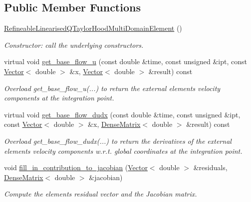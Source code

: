 \subsection*{Public Member Functions}
\begin{DoxyCompactItemize}
\item 
\hyperlink{classRefineableLinearisedQTaylorHoodMultiDomainElement_a7871dc5c779ab057bdcbc22bf541ff3d}{Refineable\+Linearised\+Q\+Taylor\+Hood\+Multi\+Domain\+Element} ()
\begin{DoxyCompactList}\small\item\em Constructor\+: call the underlying constructors. \end{DoxyCompactList}\item 
virtual void \hyperlink{classRefineableLinearisedQTaylorHoodMultiDomainElement_add3d103c76066426856143d9b683053d}{get\+\_\+base\+\_\+flow\+\_\+u} (const double \&time, const unsigned \&ipt, const \hyperlink{classoomph_1_1Vector}{Vector}$<$ double $>$ \&x, \hyperlink{classoomph_1_1Vector}{Vector}$<$ double $>$ \&result) const
\begin{DoxyCompactList}\small\item\em Overload get\+\_\+base\+\_\+flow\+\_\+u(...) to return the external element\textquotesingle{}s velocity components at the integration point. \end{DoxyCompactList}\item 
virtual void \hyperlink{classRefineableLinearisedQTaylorHoodMultiDomainElement_ad22978ef877f7a79f05a613a9aa101fd}{get\+\_\+base\+\_\+flow\+\_\+dudx} (const double \&time, const unsigned \&ipt, const \hyperlink{classoomph_1_1Vector}{Vector}$<$ double $>$ \&x, \hyperlink{classoomph_1_1DenseMatrix}{Dense\+Matrix}$<$ double $>$ \&result) const
\begin{DoxyCompactList}\small\item\em Overload get\+\_\+base\+\_\+flow\+\_\+dudx(...) to return the derivatives of the external element\textquotesingle{}s velocity components w.\+r.\+t. global coordinates at the integration point. \end{DoxyCompactList}\item 
void \hyperlink{classRefineableLinearisedQTaylorHoodMultiDomainElement_ae9582bd850c53a41150ffd4c67dd0f00}{fill\+\_\+in\+\_\+contribution\+\_\+to\+\_\+jacobian} (\hyperlink{classoomph_1_1Vector}{Vector}$<$ double $>$ \&residuals, \hyperlink{classoomph_1_1DenseMatrix}{Dense\+Matrix}$<$ double $>$ \&jacobian)
\begin{DoxyCompactList}\small\item\em Compute the element\textquotesingle{}s residual vector and the Jacobian matrix. \end{DoxyCompactList}\end{DoxyCompactItemize}
